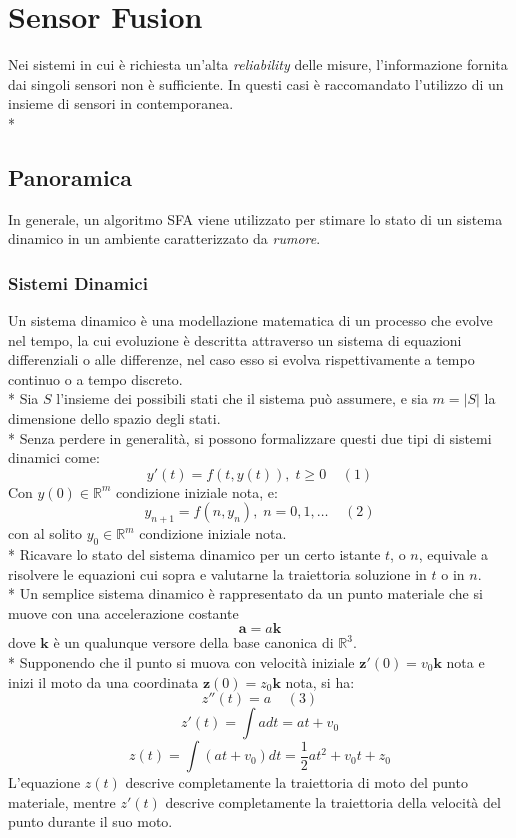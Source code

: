 \chapter{Sensor Fusion}
Nei sistemi in cui \`e richiesta un'alta \emph{reliability} delle misure, l'informazione fornita dai singoli sensori non \`e sufficiente. In questi casi \`e raccomandato l'utilizzo di un insieme di sensori in contemporanea.\\*
\section{Panoramica}
In generale, un algoritmo SFA viene utilizzato per stimare lo stato di un sistema dinamico in un ambiente caratterizzato da \emph{rumore}.
\subsection{Sistemi Dinamici}
Un sistema dinamico \`e una modellazione matematica di un processo che evolve nel tempo, la cui evoluzione \`e descritta attraverso un sistema di equazioni differenziali o alle differenze, nel caso esso si evolva rispettivamente a tempo continuo o a tempo discreto.\\*
Sia $S$ l'insieme dei possibili stati che il sistema pu\`o assumere, e sia $m = |S|$ la dimensione dello spazio degli stati.\\*
Senza perdere in generalit\`a, si possono formalizzare questi due tipi di sistemi dinamici come:
$$
y'(t) = f(t,y(t)),\;t\ge 0\;\;\;\;(1)
$$
Con $y(0) \in \mathbb{R}^m$ condizione iniziale nota, e:
$$
y_{n+1} = f(n,y_n),\;n = 0,1,\dots\;\;\;\;(2)
$$
con al solito $y_0 \in \mathbb{R}^m$ condizione iniziale nota.\\*
Ricavare lo stato del sistema dinamico per un certo istante $t$, o $n$, equivale a risolvere le equazioni cui sopra e valutarne la traiettoria soluzione in $t$ o in $n$.\\*
Un semplice sistema dinamico \`e rappresentato da un punto materiale che si muove con una accelerazione costante $$\mathbf{a} = a\mathbf{k}$$ dove $\mathbf{k}$ \`e un qualunque versore della base canonica di $\mathbb{R}^3$.\\*
Supponendo che il punto si muova con velocit\`a iniziale $\mathbf{z'}(0) = v_0\mathbf{k}$ nota e inizi il moto da una coordinata $\mathbf z(0) = z_0\mathbf{k}$ nota, si ha:
$$
z''(t) = a\;\;\;\;(3)
$$
$$
z'(t) = \int{a dt} = a t + v_0
$$
$$
z(t) = \int(a t + v_0)dt = \frac{1}{2} at^2 +  v_0 t + z_0
$$
L'equazione $z(t)$ descrive completamente la traiettoria di moto del punto materiale, mentre $z'(t)$ descrive completamente la traiettoria della velocit\`a del punto durante il suo moto.
